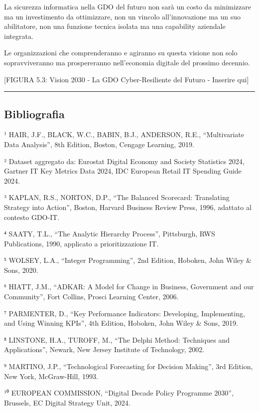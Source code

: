 \documentclass{report}
\begin{document}
La sicurezza informatica nella GDO del futuro non sarà un costo da
minimizzare ma un investimento da ottimizzare, non un vincolo
all'innovazione ma un suo abilitatore, non una funzione tecnica isolata
ma una capability aziendale integrata.

Le organizzazioni che comprenderanno e agiranno su questa visione non
solo sopravviveranno ma prospereranno nell'economia digitale del
prossimo decennio.

{[}FIGURA 5.3: Vision 2030 - La GDO Cyber-Resiliente del Futuro -
Inserire qui{]}

\begin{center}\rule{0.5\linewidth}{0.5pt}\end{center}

\subsection{Bibliografia}\label{bibliografia-2}

¹ HAIR, J.F., BLACK, W.C., BABIN, B.J., ANDERSON, R.E., ``Multivariate
Data Analysis'', 8th Edition, Boston, Cengage Learning, 2019.

² Dataset aggregato da: Eurostat Digital Economy and Society Statistics
2024, Gartner IT Key Metrics Data 2024, IDC European Retail IT Spending
Guide 2024.

³ KAPLAN, R.S., NORTON, D.P., ``The Balanced Scorecard: Translating
Strategy into Action'', Boston, Harvard Business Review Press, 1996,
adattato al contesto GDO-IT.

⁴ SAATY, T.L., ``The Analytic Hierarchy Process'', Pittsburgh, RWS
Publications, 1990, applicato a prioritizzazione IT.

⁵ WOLSEY, L.A., ``Integer Programming'', 2nd Edition, Hoboken, John
Wiley \& Sons, 2020.

⁶ HIATT, J.M., ``ADKAR: A Model for Change in Business, Government and
our Community'', Fort Collins, Prosci Learning Center, 2006.

⁷ PARMENTER, D., ``Key Performance Indicators: Developing, Implementing,
and Using Winning KPIs'', 4th Edition, Hoboken, John Wiley \& Sons,
2019.

⁸ LINSTONE, H.A., TUROFF, M., ``The Delphi Method: Techniques and
Applications'', Newark, New Jersey Institute of Technology, 2002.

⁹ MARTINO, J.P., ``Technological Forecasting for Decision Making'', 3rd
Edition, New York, McGraw-Hill, 1993.

¹⁰ EUROPEAN COMMISSION, ``Digital Decade Policy Programme 2030'',
Brussels, EC Digital Strategy Unit, 2024.
\end{document}
